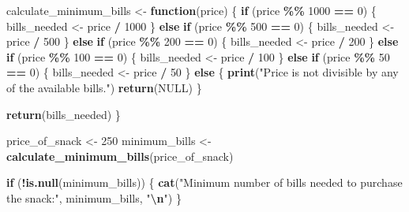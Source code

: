 \documentclass[
]{article}
\newenvironment{Shaded}{\begin{snugshade}}{\end{snugshade}}
\newcommand{\ConstantTok}[1]{\textcolor[rgb]{0.56,0.35,0.01}{#1}}
\newcommand{\ControlFlowTok}[1]{\textcolor[rgb]{0.13,0.29,0.53}{\textbf{#1}}}
\newcommand{\DecValTok}[1]{\textcolor[rgb]{0.00,0.00,0.81}{#1}}
\newcommand{\FunctionTok}[1]{\textcolor[rgb]{0.13,0.29,0.53}{\textbf{#1}}}
\newcommand{\NormalTok}[1]{#1}
\newcommand{\OtherTok}[1]{\textcolor[rgb]{0.56,0.35,0.01}{#1}}
\newcommand{\SpecialCharTok}[1]{\textcolor[rgb]{0.81,0.36,0.00}{\textbf{#1}}}
\newcommand{\StringTok}[1]{\textcolor[rgb]{0.31,0.60,0.02}{#1}}
\begin{document}
\begin{Shaded}
\begin{Highlighting}[]
\NormalTok{calculate\_minimum\_bills }\OtherTok{\textless{}{-}} \ControlFlowTok{function}\NormalTok{(price) \{}
  \ControlFlowTok{if}\NormalTok{ (price }\SpecialCharTok{\%\%} \DecValTok{1000} \SpecialCharTok{==} \DecValTok{0}\NormalTok{) \{}
\NormalTok{    bills\_needed }\OtherTok{\textless{}{-}}\NormalTok{ price }\SpecialCharTok{/} \DecValTok{1000}
\NormalTok{  \} }\ControlFlowTok{else} \ControlFlowTok{if}\NormalTok{ (price }\SpecialCharTok{\%\%} \DecValTok{500} \SpecialCharTok{==} \DecValTok{0}\NormalTok{) \{}
\NormalTok{    bills\_needed }\OtherTok{\textless{}{-}}\NormalTok{ price }\SpecialCharTok{/} \DecValTok{500}
\NormalTok{  \} }\ControlFlowTok{else} \ControlFlowTok{if}\NormalTok{ (price }\SpecialCharTok{\%\%} \DecValTok{200} \SpecialCharTok{==} \DecValTok{0}\NormalTok{) \{}
\NormalTok{    bills\_needed }\OtherTok{\textless{}{-}}\NormalTok{ price }\SpecialCharTok{/} \DecValTok{200}
\NormalTok{  \} }\ControlFlowTok{else} \ControlFlowTok{if}\NormalTok{ (price }\SpecialCharTok{\%\%} \DecValTok{100} \SpecialCharTok{==} \DecValTok{0}\NormalTok{) \{}
\NormalTok{    bills\_needed }\OtherTok{\textless{}{-}}\NormalTok{ price }\SpecialCharTok{/} \DecValTok{100}
\NormalTok{  \} }\ControlFlowTok{else} \ControlFlowTok{if}\NormalTok{ (price }\SpecialCharTok{\%\%} \DecValTok{50} \SpecialCharTok{==} \DecValTok{0}\NormalTok{) \{}
\NormalTok{    bills\_needed }\OtherTok{\textless{}{-}}\NormalTok{ price }\SpecialCharTok{/} \DecValTok{50}
\NormalTok{  \} }\ControlFlowTok{else}\NormalTok{ \{}
    \FunctionTok{print}\NormalTok{(}\StringTok{"Price is not divisible by any of the available bills."}\NormalTok{)}
    \FunctionTok{return}\NormalTok{(}\ConstantTok{NULL}\NormalTok{)}
\NormalTok{  \}}
  
  \FunctionTok{return}\NormalTok{(bills\_needed)}
\NormalTok{\}}

\NormalTok{price\_of\_snack }\OtherTok{\textless{}{-}} \DecValTok{250} 
\NormalTok{minimum\_bills }\OtherTok{\textless{}{-}} \FunctionTok{calculate\_minimum\_bills}\NormalTok{(price\_of\_snack)}

\ControlFlowTok{if}\NormalTok{ (}\SpecialCharTok{!}\FunctionTok{is.null}\NormalTok{(minimum\_bills)) \{}
  \FunctionTok{cat}\NormalTok{(}\StringTok{"Minimum number of bills needed to purchase the snack:"}\NormalTok{, minimum\_bills, }\StringTok{"}\SpecialCharTok{\textbackslash{}n}\StringTok{"}\NormalTok{)}
\NormalTok{\}}
\end{Highlighting}
\end{Shaded}
\end{document}
